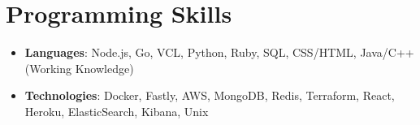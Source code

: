 \documentclass[letterpaper,11pt]{article}
\newcommand{\resumeItem}[2]{
  \item\small{
    \textbf{#1}{: #2 \vspace{-2pt}}
  }
}
\newcommand{\resumeSubItem}[2]{\resumeItem{#1}{#2}\vspace{-4pt}}
\newcommand{\resumeSubHeadingListStart}{\begin{itemize}[leftmargin=*]}
\newcommand{\resumeSubHeadingListEnd}{\end{itemize}}
\begin{document}
\section{Programming Skills}
  \resumeSubHeadingListStart
    \resumeSubItem{Languages}
      {Node.js, Go, VCL, Python, Ruby, SQL, CSS/HTML, Java/C++ (Working Knowledge)}
    \resumeSubItem{Technologies}
      {Docker, Fastly, AWS, MongoDB, Redis, Terraform, React, Heroku, ElasticSearch, Kibana, Unix }
  \resumeSubHeadingListEnd

%


\end{document}

